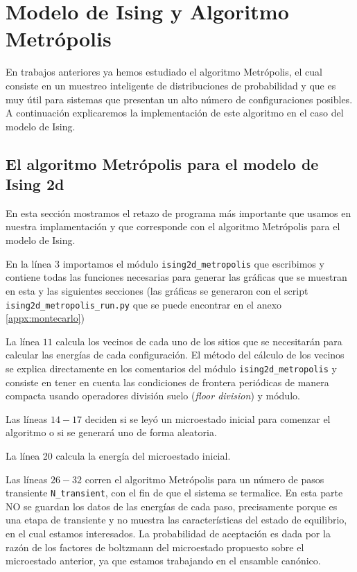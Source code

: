 \documentclass[%
 reprint,
 amsmath,amssymb,
 aps,
 pra,
]{revtex4-2}
\begin{document}
\section{Modelo de Ising y Algoritmo Metrópolis\label{sec:metropolis}}

En trabajos anteriores ya hemos estudiado el algoritmo Metrópolis, el cual consiste en un muestreo inteligente de distribuciones de probabilidad y que es muy útil para sistemas que presentan un alto número de configuraciones posibles. A continuación explicaremos la implementación de este algoritmo en el caso del modelo de Ising.

	\subsection{El algoritmo Metrópolis para el modelo de Ising 2d\label{subsec:metropolis-algoritmo}}
	
	En esta sección mostramos el retazo de programa más importante que usamos en nuestra implamentación y que corresponde con el algoritmo Metrópolis para el modelo de Ising.

	En la línea 3 importamos el módulo \texttt{ising2d_metropolis} que escribimos y contiene todas las funciones necesarias para generar las gráficas que se muestran en esta y las siguientes secciones (las gráficas se generaron con el script \texttt{ising2d_metropolis_run.py} que se puede encontrar en el anexo \ref{appx:montecarlo})

	La línea $11$ calcula los vecinos de cada uno de los sitios que se necesitarán para calcular las energías de cada configuración. El método del cálculo de los vecinos se explica directamente en los comentarios del módulo \texttt{ising2d_metropolis} y consiste en tener en cuenta las condiciones de frontera periódicas de manera compacta usando operadores división suelo (\textit{floor division}) y módulo.

	Las líneas $14-17$ deciden si se leyó un microestado inicial para comenzar el algoritmo o si se generará uno de forma aleatoria.

	La línea 20 calcula la energía del microestado inicial.

	Las líneas $26-32$ corren el algoritmo Metrópolis para un número de pasos transiente \texttt{N_transient}, con el fin de que el sistema se termalice. En esta parte NO se guardan los datos de las energías de cada paso, precisamente porque es una etapa de transiente y no muestra las características del estado de equilibrio, en el cual estamos interesados. La probabilidad de aceptación es dada por la razón de los factores de boltzmann del microestado propuesto sobre el microestado anterior, ya que estamos trabajando en el ensamble canónico.
\end{document}
